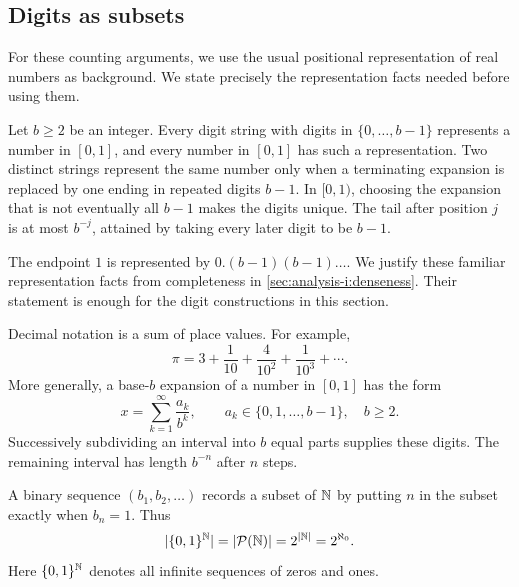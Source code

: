 \subsection{Digits as subsets}
For these counting arguments, we use the usual positional representation
of real numbers as background. We state precisely the representation facts
needed before using them.
\begin{theorem}
  \label{thm:analysis-i:positional-representation}
  Let $b\geq2$ be an integer. Every digit string with digits in
  $\{0,\ldots,b-1\}$ represents a number in $[0,1]$, and every number
  in $[0,1]$ has such a representation. Two distinct strings represent
  the same number only when a terminating expansion is replaced by one
  ending in repeated digits $b-1$. In $[0,1)$, choosing the expansion
  that is not eventually all $b-1$ makes the digits unique.
  The tail after position $j$ is at most $b^{-j}$, attained by taking
  every later digit to be $b-1$.
\end{theorem}
The endpoint $1$ is represented by $0.(b-1)(b-1)\ldots$.
We justify these familiar representation facts from completeness in
\autoref{sec:analysis-i:denseness}. Their statement is enough for the
digit constructions in this section.

Decimal notation is a sum of place values. For example,
\[
  \pi=3+\frac{1}{10}+\frac{4}{10^2}+\frac{1}{10^3}+\cdots.
\]
More generally, a base-$b$ expansion of a number in $[0,1]$ has the form
\[
  x=\sum_{k=1}^{\infty}\frac{a_k}{b^k},
  \qquad a_k\in\{0,1,\ldots,b-1\},\quad b\geq2.
\]
Successively subdividing an interval into $b$ equal parts supplies these
digits. The remaining interval has length $b^{-n}$ after $n$ steps.


A binary sequence $(b_1,b_2,\ldots)$ records a subset of $\mathbb{N}$ by putting
$n$ in the subset exactly when $b_n=1$. Thus
\[
  |\{0,1\}^{\mathbb{N}}|=|\mathcal P(\mathbb{N})|=2^{|\mathbb{N}|}=2^{\aleph_0}.
\]
Here $\{0,1\}^{\mathbb{N}}$ denotes all infinite sequences of zeros and ones.


